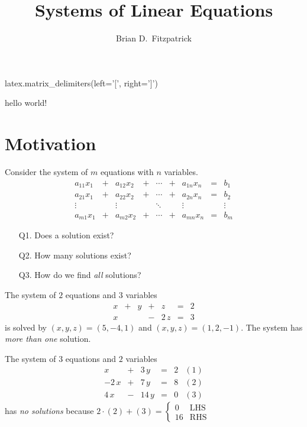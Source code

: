 \documentclass[12pt]{article}
\begin{document}
\title{Systems of Linear Equations}
\author{Brian D.\ Fitzpatrick}
\date{\cite[\S1.1]{peterson}}

\maketitle


\begin{sagesilent}
  latex.matrix_delimiters(left='[', right=']')
\end{sagesilent}

hello world!

\section{Motivation}

Consider the system of $m$ equations with $n$ variables.
\begin{equation}\label{eq:motivation}
  \begin{array}{rcrcccrcr}
    a_{11}x_1 & + & a_{12}x_2 & + & \dotsb & + & a_{1n}x_n & = & b_1    \\
    a_{21}x_1 & + & a_{22}x_2 & + & \dotsb & + & a_{2n}x_n & = & b_2    \\
    \vdots    &   & \vdots    &   & \ddots &   & \vdots    &   & \vdots \\
    a_{m1}x_1 & + & a_{m2}x_2 & + & \dotsb & + & a_{mn}x_n & = & b_m
  \end{array}\tag{$\ast$}
\end{equation}
\begin{itemize}
\item[Q1.] Does a solution exist?
\item[Q2.] How many solutions exist?
\item[Q3.] How do we find \emph{all} solutions?
\end{itemize}

\begin{ex}
  The system of $2$ equations and $3$ variables
  \[
  \begin{array}{rcrcrcr}
    x & + & y & + & z    & = & 2  \\
    x &   &   & - & 2\,z & = & 3
  \end{array}
  \]
  is solved by $(x,y,z)=(5,-4,1)$ and $(x,y,z)=(1,2,-1)$. The system has
  \emph{more than one} solution.
\end{ex}

\begin{ex}
  The system of $3$ equations and $2$ variables
  \[
  \begin{array}{rcrcrr}
    x     & + & 3\,y  & = & 2 & (1)\\
    -2\,x & + & 7\,y  & = & 8 & (2)\\
    4\,x  & - & 14\,y & = & 0 & (3)
  \end{array}
  \]
  has \emph{no solutions} because
  $
  2\cdot(2)+(3)
  =
  \begin{cases}
    0 & \text{LHS} \\
    16 & \text{RHS}
  \end{cases}
  $
\end{ex}
\end{document}
